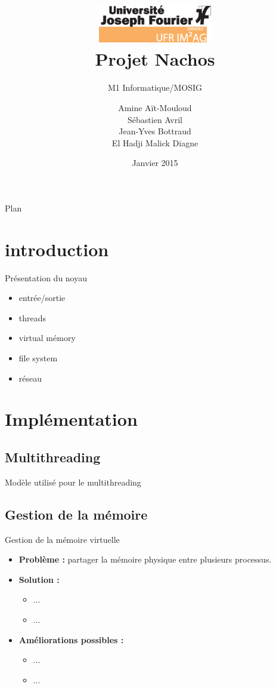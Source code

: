 \documentclass{beamer}
\title{\includegraphics[width=5cm]{LOGO_IM2AG_UJF.eps}
\\ Projet Nachos}
\subtitle{M1 Informatique/MOSIG}
\author{Amine Aït-Mouloud
\\ Sébastien Avril
\\ Jean-Yves Bottraud
\\ El Hadji Malick Diagne
}
\date{Janvier 2015}
\begin{document}
\frame{\titlepage} 

\begin{frame}
    \tableofcontents
\end{frame}

\begin{frame}{Plan}
    \tableofcontents[currentsection]
\end{frame}

\section{introduction}
\begin{frame}{Présentation du noyau}
	\begin{itemize}
		\item entrée/sortie
		\item threads
		\item virtual mémory
		\item file system
		\item réseau
	\end{itemize}
\end{frame}

\section{Implémentation}
\subsection{Multithreading}
\begin{frame}{Modèle utilisé pour le multithreading}
   
\end{frame}


\subsection{Gestion de la mémoire}
\begin{frame}{Gestion de la mémoire virtuelle}
    \begin{itemize}
        \item \textbf{Problème :} partager la mémoire physique entre plusieurs processus.
        \item \textbf{Solution :}
            \begin{itemize}
                \item ...
                \item ...
            \end{itemize}
        \item \textbf{Améliorations possibles :}
            \begin{itemize}
                \item ...
                \item ...
            \end{itemize}
    \end{itemize}
\end{frame}
\end{document}
